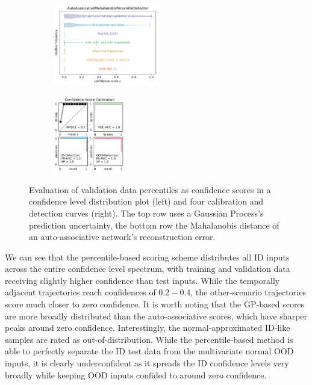 \begin{figure}[H]
    \begin{subfigure}
        \centering
        \includegraphics[width=0.505\textwidth,valign=t]{ood-detection/figures/confidence-score/ood.autoassociativemahalanobispercentiledetector-distribution.pdf}
    \end{subfigure}
    \begin{subfigure}
        \centering
        \includegraphics[width=0.345\textwidth,valign=t]{ood-detection/figures/confidence-score/ood.autoassociativemahalanobispercentiledetector-calibration.pdf}
    \end{subfigure}

    \caption[Evaluation of Validation Data Percentiles as Confidence Scores]{Evaluation of validation data percentiles as confidence scores in a confidence level distribution plot (left) and four calibration and detection curves (right). The top row uses a Gaussian Process's prediction uncertainty, the bottom row the Mahalanobis distance of an auto-associative network's reconstruction error.}
    \label{fig:percentile-ood-scoring}
\end{figure}

\noindent We can see that the percentile-based scoring scheme distributes all ID inputs across the entire confidence level spectrum, with training and validation data receiving slightly higher confidence than test inputs. While the temporally adjacent trajectories reach confidences of $0.2-0.4$, the other-scenario trajectories score much closer to zero confidence. It is worth noting that the GP-based scores are more broadly distributed than the auto-associative scores, which have sharper peaks around zero confidence. Interestingly, the normal-approximated ID-like samples are rated as out-of-distribution. While the percentile-based method is able to perfectly separate the ID test data from the multivariate normal OOD inputs, it is clearly underconfident as it spreads the ID confidence levels very broadly while keeping OOD inputs confided to around zero confidence.

